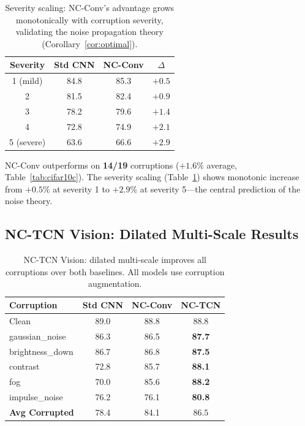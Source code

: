 \documentclass[journal]{IEEEtran}
\begin{document}
\begin{table}[t]
\centering
\caption{Severity scaling: NC-Conv's advantage grows monotonically with corruption severity, validating the noise propagation theory (Corollary~\ref{cor:optimal}).}
\label{tab:severity}
\small
\begin{tabular}{@{}cccc@{}}
\toprule
\textbf{Severity} & \textbf{Std CNN} & \textbf{NC-Conv} & $\Delta$ \\
\midrule
1 (mild)   & 84.8 & 85.3 & $+0.5$ \\
2          & 81.5 & 82.4 & $+0.9$ \\
3          & 78.2 & 79.6 & $+1.4$ \\
4          & 72.8 & 74.9 & $+2.1$ \\
5 (severe) & 63.6 & 66.6 & $\mathbf{+2.9}$ \\
\bottomrule
\end{tabular}
\end{table}

NC-Conv outperforms on \textbf{14/19} corruptions ($+1.6\%$ average, Table~\ref{tab:cifar10c}).
The severity scaling (Table~\ref{tab:severity}) shows monotonic increase from $+0.5\%$ at severity 1 to $+2.9\%$ at severity 5---the central prediction of the noise theory.

\subsection{NC-TCN Vision: Dilated Multi-Scale Results}
\label{sec:nctcn_exp}

\begin{table}[t]
\centering
\caption{NC-TCN Vision: dilated multi-scale improves all corruptions over both baselines. All models use corruption augmentation.}
\label{tab:nctcn}
\small
\begin{tabular}{@{}lccc@{}}
\toprule
\textbf{Corruption} & \textbf{Std CNN} & \textbf{NC-Conv} & \textbf{NC-TCN} \\
\midrule
Clean              & 89.0 & 88.8 & 88.8 \\
gaussian\_noise    & 86.3 & 86.5 & \textbf{87.7} \\
brightness\_down   & 86.7 & 86.8 & \textbf{87.5} \\
contrast           & 72.8 & 85.7 & \textbf{88.1} \\
fog                & 70.0 & 85.6 & \textbf{88.2} \\
impulse\_noise     & 76.2 & 76.1 & \textbf{80.8} \\
\midrule
\textbf{Avg Corrupted} & 78.4 & 84.1 & $\mathbf{86.5}$ \\
\bottomrule
\end{tabular}
\end{table}
\end{document}
